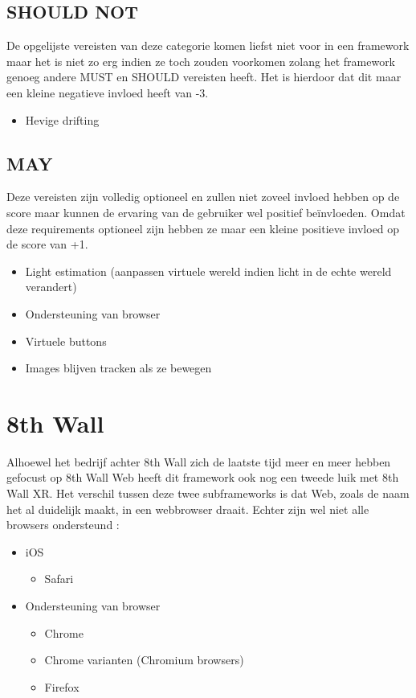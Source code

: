 \subsection{SHOULD NOT}
De opgelijste vereisten van deze categorie komen liefst niet voor in een framework maar het is niet zo erg indien ze toch zouden voorkomen zolang het framework genoeg andere MUST en SHOULD vereisten heeft. Het is hierdoor dat dit maar een kleine negatieve invloed heeft van -3.
\begin{itemize}
    \item Hevige drifting
\end{itemize} 

\subsection{MAY}
Deze vereisten zijn volledig optioneel en zullen niet zoveel invloed hebben op de score maar kunnen de ervaring van de gebruiker wel positief beïnvloeden. Omdat deze requirements optioneel zijn hebben ze maar een kleine positieve invloed op de score van +1.
\begin{itemize}
    \item Light estimation (aanpassen virtuele wereld indien licht in de echte wereld verandert)
    \item Ondersteuning van browser
     \item Virtuele buttons
     \item Images blijven tracken als ze bewegen
\end{itemize} 

\section{8th Wall}
Alhoewel het bedrijf achter 8th Wall zich de laatste tijd meer en meer hebben gefocust op 8th Wall Web heeft dit framework ook nog een tweede luik met 8th Wall XR. Het verschil tussen deze twee subframeworks is dat Web, zoals de naam het al duidelijk maakt, in een webbrowser draait. Echter zijn wel niet alle browsers ondersteund \autocite{8thWallWebReq}:
\begin{itemize}
    \item iOS
    \begin{itemize}
        \item Safari
    \end{itemize}
    \item Ondersteuning van browser
    \begin{itemize}
        \item Chrome
        \item Chrome varianten (Chromium browsers)
        \item Firefox
    \end{itemize}
\end{itemize} 


